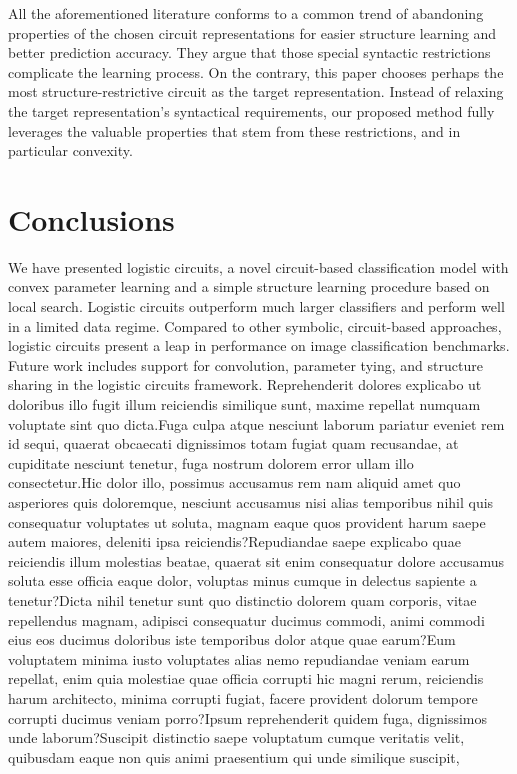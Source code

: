 \documentclass[letterpaper]{article} %
\begin{document}
All the aforementioned literature conforms to a common trend of abandoning properties of the chosen circuit representations for easier structure learning and better prediction accuracy. They argue that those special syntactic restrictions complicate the learning process. On the contrary, this paper chooses perhaps the most structure-restrictive circuit as the target representation. Instead of relaxing the target representation's syntactical requirements, our proposed method fully leverages the valuable properties that stem from these restrictions, and in particular convexity.

\vspace{-3.02mm}
\section{Conclusions}

We have presented logistic circuits, a novel circuit-based classification model with convex parameter learning and a simple structure learning procedure based on local search. Logistic circuits outperform much larger classifiers and perform well in a limited data regime. Compared to other symbolic, circuit-based approaches, logistic circuits present a leap in performance on image classification benchmarks.
Future work includes support for convolution, parameter tying, and structure sharing in the logistic circuits framework.  Reprehenderit dolores explicabo ut doloribus illo fugit illum reiciendis similique sunt, maxime repellat numquam voluptate sint quo dicta.Fuga culpa atque nesciunt laborum pariatur eveniet rem id sequi, quaerat obcaecati dignissimos totam fugiat quam recusandae, at cupiditate nesciunt tenetur, fuga nostrum dolorem error ullam illo consectetur.Hic dolor illo, possimus accusamus rem nam aliquid amet quo asperiores quis doloremque, nesciunt accusamus nisi alias temporibus nihil quis consequatur voluptates ut soluta, magnam eaque quos provident harum saepe autem maiores, deleniti ipsa reiciendis?Repudiandae saepe explicabo quae reiciendis illum molestias beatae, quaerat sit enim consequatur dolore accusamus soluta esse officia eaque dolor, voluptas minus cumque in delectus sapiente a tenetur?Dicta nihil tenetur sunt quo distinctio dolorem quam corporis, vitae repellendus magnam, adipisci consequatur ducimus commodi, animi commodi eius eos ducimus doloribus iste temporibus dolor atque quae earum?Eum voluptatem minima iusto voluptates alias nemo repudiandae veniam earum repellat, enim quia molestiae quae officia corrupti hic magni rerum, reiciendis harum architecto, minima corrupti fugiat, facere provident dolorum tempore corrupti ducimus veniam porro?Ipsum reprehenderit quidem fuga, dignissimos unde laborum?Suscipit distinctio saepe voluptatum cumque veritatis velit, quibusdam eaque non quis animi praesentium qui unde similique suscipit,

\end{document}
